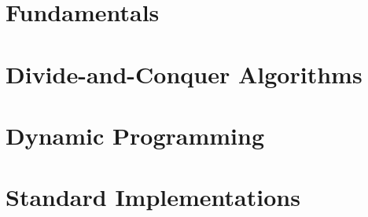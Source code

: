 \documentclass{book}
\newcommand{\LoadSection}[1]{{}}
\begin{document}
\thispagestyle{plain}
\MakeCustomTitle
\bigskip



{
    \hypersetup{linkcolor=black}
    \tableofcontents
}

\newpage
\mainmatter

\chapter{Fundamentals}%
\label{cha:fundamentals}

    \LoadSection{fundamentals/performance-and-big-o}
    \LoadSection{fundamentals/dynamic-arrays}
    \LoadSection{fundamentals/array-search-algorithms}
    \LoadSection{fundamentals/sorting-algorithms}
    \LoadSection{fundamentals/linked-lists}
    \LoadSection{fundamentals/bsts}
    \newpage
    \LoadSection{fundamentals/binary-heaps/intro}
    \newpage
    \LoadSection{fundamentals/binary-heaps/array-indexing}
    \newpage
    \LoadSection{fundamentals/binary-heaps/push}
    \newpage
    \LoadSection{fundamentals/binary-heaps/pop}
    \newpage
    \LoadSection{fundamentals/binary-heaps/pushpop}
    \newpage
    \LoadSection{fundamentals/binary-heaps/heapify}
    \newpage
    \LoadSection{fundamentals/binary-heaps/further-reading}
    \LoadSection{fundamentals/binary-heaps/references}
    \newpage
    \LoadSection{fundamentals/tries}
    \LoadSection{fundamentals/hash-tables}
    \LoadSection{fundamentals/graphs}

\newpage
\chapter{Divide-and-Conquer Algorithms}%
\label{cha:doc}

    \LoadSection{divide-and-conquer/intro}
    \LoadSection{divide-and-conquer/karatsuba-multiplication}
    \LoadSection{divide-and-conquer/fft}

\newpage
\chapter{Dynamic Programming}
\label{cha:dp}

    \LoadSection{dynamic-programming/intro}
    \LoadSection{dynamic-programming/fibonacci-sequence}
    \LoadSection{dynamic-programming/01-knapsack-problem}

\newpage
\chapter{Standard Implementations}
\label{cha:standard-implementations}
\end{document}
